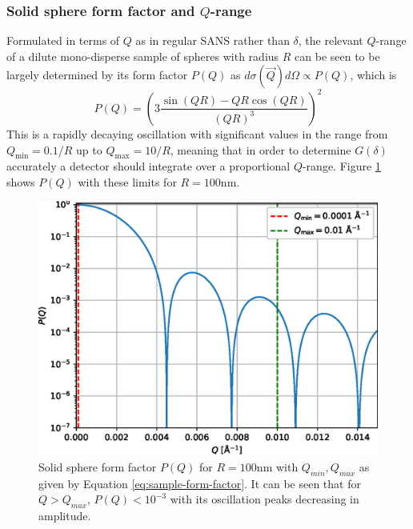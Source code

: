 \documentclass{article}
\begin{document}
\newpage

\subsubsection{Solid sphere form factor and $Q$-range}
Formulated in terms of $Q$ as in regular SANS rather than $\delta$, the relevant $Q$-range of a dilute mono-disperse sample of spheres with radius $R$ can be seen to be largely determined by its form factor $P(Q)$ as $d\sigma(\vec{Q})d\Omega\propto P(Q)$, which is \cite{rekveldt1996}
\begin{equation}
	P(Q) = \left(3\frac{\sin(QR) - QR\cos(QR)}{\left(QR\right)^3}\right)^2\label{eq:sample-form-factor}
\end{equation}
This is a rapidly decaying oscillation with significant values in the range from $Q_{\text{min}} = 0.1/R$ up to $Q_{\text{max}} = 10/R$, meaning that in order to determine $G(\delta)$ accurately a detector should integrate over a proportional $Q$-range.  Figure \ref{fig:analytical-P} shows $P(Q)$ with these limits for $R = 100\unit{\nano\meter}$.  

\begin{figure}
	\centering
	\includegraphics[width=0.5\linewidth]{analytical-P-log}
	\caption{Solid sphere form factor $P(Q)$ for $R = 100\unit{\nano\meter}$ with $Q_{min}, Q_{max}$ as given by Equation \eqref{eq:sample-form-factor}. It can be seen that for $Q > Q_{max}$, $P(Q) < 10^{-3}$ with its oscillation peaks decreasing in amplitude.}
	\label{fig:analytical-P}
\end{figure}
\end{document}
